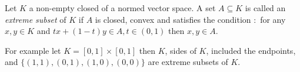 \documentclass[12pt]{article}
\begin{document}
Let $K$ a non-empty closed  of a normed vector space. A set $A\subseteq K$ is called an \emph{extreme subset} of $K$
if $A$ is closed, convex and satisfies the condition $\colon$ for any $x,y \in K$ and $tx+(1-t)y \in A,
t\in (0,1)$ then $x, y \in A$.

For example let $K=[0,1]\times[0,1]$ then $K$, sides of $K$, included the endpoints, and $\{(1,1),(0,1),(1,0),(0,0)\}$ are extreme subsets of $K$.
\end{document}
